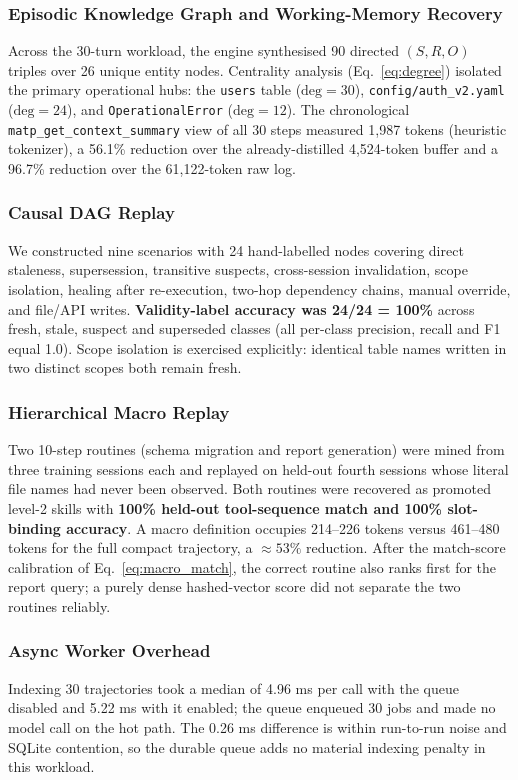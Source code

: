 \documentclass[lettersize,journal]{IEEEtran}
\begin{document}
\subsubsection{Episodic Knowledge Graph and Working-Memory Recovery}
Across the 30-turn workload, the engine synthesised 90 directed $(S, R, O)$ triples over 26 unique entity nodes. Centrality analysis (Eq.~\eqref{eq:degree}) isolated the primary operational hubs: the \texttt{users} table ($\text{deg}=30$), \texttt{config/auth\_v2.yaml} ($\text{deg}=24$), and \texttt{OperationalError} ($\text{deg}=12$). The chronological \texttt{matp\_get\_context\_summary} view of all 30 steps measured 1,987 tokens (heuristic tokenizer), a 56.1\% reduction over the already-distilled 4,524-token buffer and a 96.7\% reduction over the 61,122-token raw log.

\subsubsection{Causal DAG Replay}
We constructed nine scenarios with 24 hand-labelled nodes covering direct staleness, supersession, transitive suspects, cross-session invalidation, scope isolation, healing after re-execution, two-hop dependency chains, manual override, and file/API writes. \textbf{Validity-label accuracy was 24/24 = 100\%} across fresh, stale, suspect and superseded classes (all per-class precision, recall and F1 equal 1.0). Scope isolation is exercised explicitly: identical table names written in two distinct scopes both remain fresh.

\subsubsection{Hierarchical Macro Replay}
Two 10-step routines (schema migration and report generation) were mined from three training sessions each and replayed on held-out fourth sessions whose literal file names had never been observed. Both routines were recovered as promoted level-2 skills with \textbf{100\% held-out tool-sequence match and 100\% slot-binding accuracy}. A macro definition occupies 214--226 tokens versus 461--480 tokens for the full compact trajectory, a $\approx 53\%$ reduction. After the match-score calibration of Eq.~\eqref{eq:macro_match}, the correct routine also ranks first for the report query; a purely dense hashed-vector score did not separate the two routines reliably.

\subsubsection{Async Worker Overhead}
Indexing 30 trajectories took a median of 4.96 ms per call with the queue disabled and 5.22 ms with it enabled; the queue enqueued 30 jobs and made no model call on the hot path. The 0.26 ms difference is within run-to-run noise and SQLite contention, so the durable queue adds no material indexing penalty in this workload.
\end{document}
